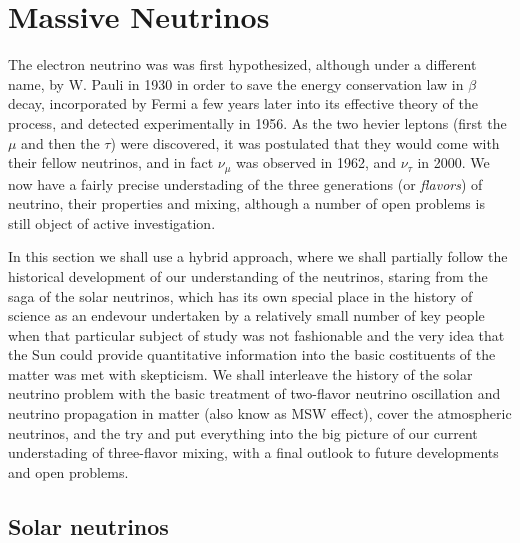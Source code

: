\chapter{Massive Neutrinos}

The electron neutrino was was first hypothesized, although under a different name,
by W. Pauli in 1930 in order to save the energy conservation law in $\beta$ decay,
incorporated by Fermi a few years later into its effective theory of the process,
and detected experimentally in 1956.
As the two hevier leptons (first the $\mu$ and then the $\tau$) were discovered, it
was postulated that they would come with their fellow neutrinos, and in fact $\nu_\mu$
was observed in 1962, and $\nu_\tau$ in 2000. We now have a fairly precise understading
of the three generations (or \emph{flavors}) of neutrino, their properties and
mixing, although a number of open problems is still object of active investigation.

In this section we shall use a hybrid approach, where we shall partially follow
the historical development of our understanding of the neutrinos, staring from the
saga of the solar neutrinos, which has its own special place in the history of science
as an endevour undertaken by a relatively small number of key people when that particular
subject of study was not fashionable and the very idea that the Sun could provide
quantitative information into the basic costituents of the matter was met with skepticism.
We shall interleave the history of the solar neutrino problem with the basic treatment
of two-flavor neutrino oscillation and neutrino propagation in matter (also know as
MSW effect), cover the atmospheric neutrinos, and the try and put everything into the
big picture of our current understading of three-flavor mixing, with a final outlook
to future developments and open problems.



\section{Solar neutrinos}


